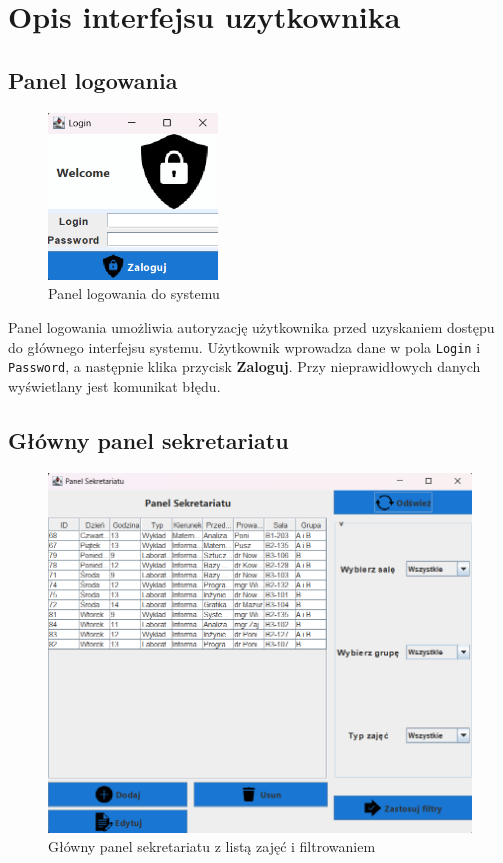 \section{Opis interfejsu uzytkownika}

\subsection*{Panel logowania}
\begin{figure}[H]
\centering
\includegraphics[width=0.4\textwidth]{figures/workApl/login_panel.png}
\caption{Panel logowania do systemu}
\label{fig:login_panel}
\end{figure}

Panel logowania umożliwia autoryzację użytkownika przed uzyskaniem dostępu do głównego interfejsu systemu. Użytkownik wprowadza dane w pola \texttt{Login} i \texttt{Password}, a następnie klika przycisk \textbf{Zaloguj}. Przy nieprawidłowych danych wyświetlany jest komunikat błędu.

\subsection*{Główny panel sekretariatu}
\begin{figure}[H]
\centering
\includegraphics[width=\textwidth]{figures/workApl/mainpanel.png}
\caption{Główny panel sekretariatu z listą zajęć i filtrowaniem}
\label{fig:mainpanel}
\end{figure}

